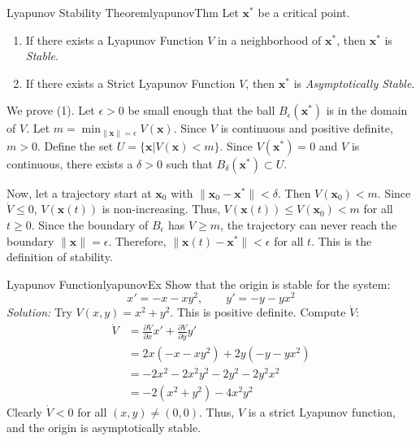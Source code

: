 \documentclass{book}
\newenvironment{Proof}[1][]
  {\begin{ProofTcb}[#1]}
  {\end{ProofTcb}}
\renewcommand{\mid}{\big|}
\begin{document}
\begin{thm}{Lyapunov Stability Theorem}{lyapunovThm}
    Let $\mathbf{x}^*$ be a critical point.
    \begin{enumerate}
        \item If there exists a Lyapunov Function $V$ in a neighborhood of $\mathbf{x}^*$, then $\mathbf{x}^*$ is \emph{Stable}.
        \item If there exists a Strict Lyapunov Function $V$, then $\mathbf{x}^*$ is \emph{Asymptotically Stable}.
    \end{enumerate}
\end{thm}

\begin{Proof}
    We prove (1). Let $\epsilon > 0$ be small enough that the ball $B_\epsilon(\mathbf{x}^*)$ is in the domain of $V$.
    Let $m = \min_{\|\mathbf{x}\| = \epsilon} V(\mathbf{x})$. Since $V$ is continuous and positive definite, $m > 0$.
    Define the set $U = \{\mathbf{x} \mid V(\mathbf{x}) < m\}$. Since $V(\mathbf{x}^*) = 0$ and $V$ is continuous, there exists a $\delta > 0$ such that $B_\delta(\mathbf{x}^*) \subset U$.

    Now, let a trajectory start at $\mathbf{x}_0$ with $\|\mathbf{x}_0 - \mathbf{x}^*\| < \delta$. Then $V(\mathbf{x}_0) < m$.
    Since $\dot{V} \le 0$, $V(\mathbf{x}(t))$ is non-increasing.
    Thus, $V(\mathbf{x}(t)) \le V(\mathbf{x}_0) < m$ for all $t \ge 0$.
    Since the boundary of $B_\epsilon$ has $V \ge m$, the trajectory can never reach the boundary $\|\mathbf{x}\| = \epsilon$.
    Therefore, $\|\mathbf{x}(t) - \mathbf{x}^*\| < \epsilon$ for all $t$. This is the definition of stability.
\end{Proof}

\begin{example}{Lyapunov Function}{lyapunovEx}
    Show that the origin is stable for the system:
    \[
        x' = -x - xy^2, \qquad y' = -y - yx^2
    \]
    \emph{Solution:}
    Try $V(x,y) = x^2 + y^2$. This is positive definite.
    Compute $\dot{V}$:
    \begin{align*}
        \dot{V} &= \frac{\partial V}{\partial x} x' + \frac{\partial V}{\partial y} y' \\
        &= 2x(-x - xy^2) + 2y(-y - yx^2) \\
        &= -2x^2 - 2x^2y^2 - 2y^2 - 2y^2x^2 \\
        &= -2(x^2 + y^2) - 4x^2y^2
    \end{align*}
    Clearly $\dot{V} < 0$ for all $(x,y) \ne (0,0)$. Thus, $V$ is a strict Lyapunov function, and the origin is asymptotically stable.
\end{example}
\end{document}
